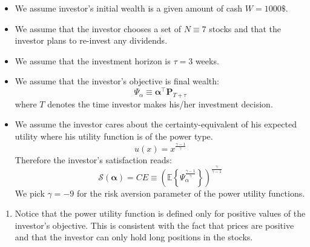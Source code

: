 \documentclass[13pt]{article}
\theoremstyle{definition}
\theoremstyle{remark}
\newenvironment{remark}
  {\pushQED{\qed}\renewcommand{\qedsymbol}{$\triangle$}\remarkx}
  {\popQED\endremarkx}
\begin{document}
\begin{itemize}
    \item We assume investor's initial wealth is a given amount of cash $W=1000\$$.
    \item We assume that the investor chooses a set of $N \equiv 7$ stocks and that the investor plans to re-invest any dividends.
    \item We assume that the investment horizon is $\tau=3$ weeks.
    \item We assume that the investor's objective is final wealth:
$$
\Psi_\alpha \equiv \boldsymbol{\alpha}^{\top} \mathbf{P}_{T+\tau}
$$
where $T$ denotes the time investor makes his/her investment decision.
    \item We assume the investor cares about the certainty-equivalent of his expected utility  where his utility function is of the power type. 
    \[
    u(x) = x^{\frac{\gamma-1}{\gamma}}
    \]Therefore the investor's satisfaction reads:
$$
\mathcal{S}(\boldsymbol{\alpha}) =CE\equiv\left(\mathbb{E}\left\{\Psi_\alpha^{\frac{\gamma-1}{\gamma}}\right\}\right)^{\frac{\gamma}{\gamma-1}}
$$
We pick $\gamma =-9$ for the risk aversion parameter of the power utility functions.
\end{itemize}

\begin{remark}
    \hfill
    \begin{enumerate}
        \item Notice that the power utility function is defined only for positive values of the investor's objective. This is consistent with the fact that prices are positive and that the investor can only hold long positions in the stocks.
    \end{enumerate}
\end{remark} 
\end{document}
